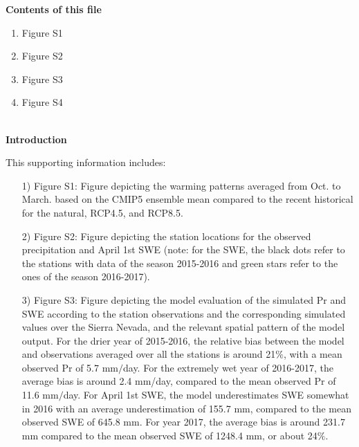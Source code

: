 \documentclass[draft,grl]{agutexSI}
\begin{document}
\begin{article}

%
%



\noindent\textbf{Contents of this file}
\begin{enumerate}
\item Figure S1
\item Figure S2
\item Figure S3
\item Figure S4
\end{enumerate}
\ \\

\noindent\textbf{Introduction}


This supporting information includes:

\begin{itemize}

\item[1)]  Figure S1: Figure depicting the warming patterns averaged from Oct. to March. based on the CMIP5 ensemble mean compared to the recent historical for the natural, RCP4.5, and RCP8.5.


\item[2)]  Figure S2: Figure depicting the station locations for the observed precipitation and April 1st SWE (note: for the SWE, the black dots refer to the stations with data of the season 2015-2016 and green stars refer to the ones of the season 2016-2017).

\item[3)]  Figure S3: Figure depicting the model evaluation of the simulated Pr and SWE according to the station observations and the corresponding simulated values over the Sierra Nevada, and the relevant spatial pattern of the model output. For the drier year of 2015-2016, the relative bias between the model and observations averaged over all the stations is around 21$\%$, with a mean observed Pr of 5.7 mm$/$day. For the extremely wet year of 2016-2017, the average bias is around 2.4 mm/day, compared to the mean observed Pr of 11.6 mm$/$day. For April 1st SWE, the model underestimates SWE somewhat in 2016 with an average underestimation of 155.7 mm, compared to the mean observed SWE of 645.8 mm. For year 2017, the average bias is around 231.7 mm compared to the mean observed SWE of 1248.4 mm, or about 24$\%$.


\end{itemize}
\end{article}
\end{document}
